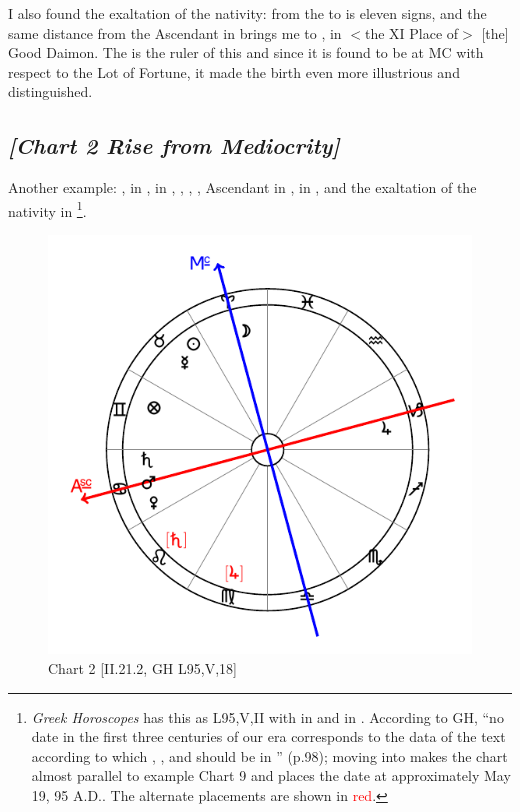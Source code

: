 I also found the exaltation of the nativity: from the \Moon\xspace to \Taurus\xspace is eleven signs, and the same distance from the Ascendant in \Libra\xspace brings me to \Leo, in $<$the XI Place of$>$ [the] Good Daimon. The \Sun\xspace is the ruler of this and since it is found to be at MC with respect to the Lot of Fortune, it made the birth even more illustrious and distinguished.
\newpage
\subsection*{\textit{[Chart 2 Rise from Mediocrity]}}

Another example: \Sun, \Mercury\xspace in \Taurus, \Moon\xspace in \Aries, \Saturn, \Mars, \Venus, Ascendant in \Cancer,
\Jupiter\xspace in \Capricorn, \Fortune\xspace and the exaltation of the nativity in \Gemini
\footnote{\textit{Greek Horoscopes} has this as L95,V,II with \Saturn\xspace in \Leo\xspace and \Jupiter\xspace in \Virgo. According to GH, ``no date in the first three centuries of our era corresponds to the data of the text according to which \Saturn, \Mars, and \Venus\xspace should be in \Cancer'' (p.98); moving \Saturn\xspace into \Leo\xspace makes the chart almost parallel to example Chart 9 and places the date at approximately May 19, 95 A.D.. The alternate placements are shown in \textcolor{red}{red}.}.

\clearpage
\begin{figure}
\centering
\vspace{-20pt}
\includegraphics[width=.68\textwidth]{charts/2_21_2}
\caption{Chart 2 [II.21.2, GH L95,V,18]}
\label{fig:chart02}
\end{figure}


